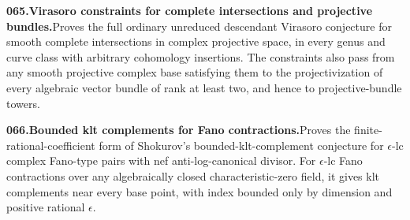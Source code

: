\documentclass[11pt,a4paper]{article}
\begin{document}
  \par \begin{minipage}{\linewidth}
  \fontsize{10.5}{12.6}\selectfont\RaggedRight
  \hypertarget{result 065}{}
  {\bfseries\textcolor{muted}{065.}\enspace Virasoro constraints for complete intersections and projective bundles.}\enspace Proves the full ordinary unreduced descendant Virasoro conjecture for smooth complete intersections in complex projective space, in every genus and curve class with arbitrary cohomology insertions. The constraints also pass from any smooth projective complex base satisfying them to the projectivization of every algebraic vector bundle of rank at least two, and hence to projective-bundle towers.\par
  \end{minipage}\par\vspace{5pt}



  \par \begin{minipage}{\linewidth}
  \fontsize{10.5}{12.6}\selectfont\RaggedRight
  \hypertarget{result 066}{}
  {\bfseries\textcolor{muted}{066.}\enspace Bounded klt complements for Fano contractions.}\enspace Proves the finite-rational-coefficient form of Shokurov’s bounded-klt-complement conjecture for $\epsilon$-lc complex Fano-type pairs with nef anti-log-canonical divisor. For $\epsilon$-lc Fano contractions over any algebraically closed characteristic-zero field, it gives klt complements near every base point, with index bounded only by dimension and positive rational $\epsilon$.\par
  \end{minipage}\par\vspace{5pt}
\end{document}
